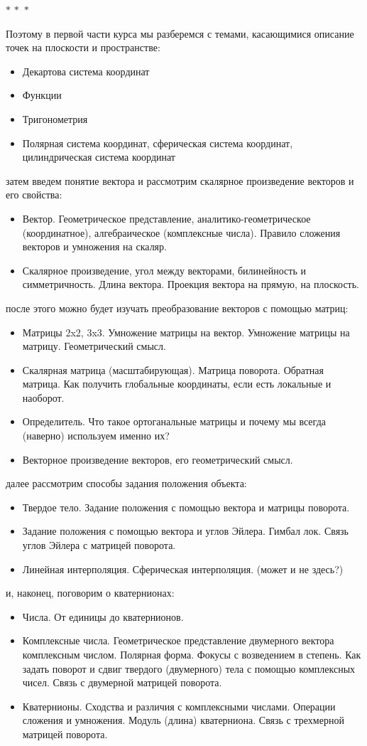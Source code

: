 \documentclass[a4paper,12pt]{article}
\newcommand{\threestars}{\begin{center}$ {\ast}\,{\ast}\,{\ast} $\end{center}}
\newcounter{z-counter}
\newcounter{th-counter}
\begin{document}
\threestars

Поэтому в первой части курса мы разберемся с темами, касающимися описание точек на плоскости и пространстве:
\begin{itemize}
    \item Декартова система координат
    \item Функции
    \item Тригонометрия
    \item Полярная система координат, сферическая система координат, цилиндрическая система координат
\end{itemize}
затем введем понятие вектора и рассмотрим скалярное произведение векторов и его свойства:
\begin{itemize}
    \item Вектор. Геометрическое представление, аналитико-геометрическое (координатное), алгебраическое (комплексные числа). Правило сложения векторов и умножения на скаляр.
    \item Скалярное произведение, угол между векторами, билинейность и симметричность. Длина вектора. Проекция вектора на прямую, на плоскость.
\end{itemize}
после этого можно будет изучать преобразование векторов с помощью матриц:
\begin{itemize}
    \item Матрицы 2x2, 3x3. Умножение матрицы на вектор. Умножение матрицы на матрицу. Геометрический смысл. 
    \item Скалярная матрица (масштабирующая). Матрица поворота. Обратная матрица. Как получить глобальные координаты, если есть локальные и наоборот.
    \item Определитель. Что такое ортоганальные матрицы и почему мы всегда (наверно) используем именно их?
    \item Векторное произведение векторов, его геометрический смысл.
\end{itemize}
далее рассмотрим способы задания положения объекта:
\begin{itemize}
    \item Твердое тело. Задание положения с помощью вектора и матрицы поворота. 
    \item Задание положения с помощью вектора и углов Эйлера. Гимбал лок. Связь углов Эйлера с матрицей поворота.
    \item Линейная интерполяция. Сферическая интерполяция. (может и не здесь?)
\end{itemize}
и, наконец, поговорим о кватернионах:
\begin{itemize}
    \item Числа. От единицы до кватернионов.
    \item Комплексные числа. Геометрическое представление двумерного вектора комплексным числом. Полярная форма. Фокусы с возведением в степень. Как задать поворот и сдвиг твердого (двумерного) тела с помощью комплексных чисел. Связь с двумерной матрицей поворота.
    \item Кватернионы. Сходства и различия с комплексными числами. Операции сложения и умножения. Модуль (длина) кватерниона. Связь с трехмерной матрицей поворота.
\end{itemize}
\end{document}
